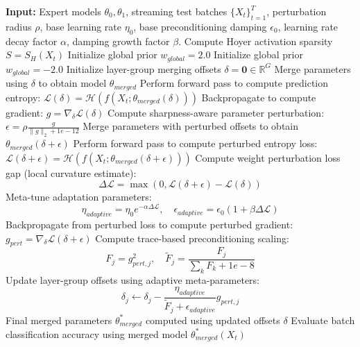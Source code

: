 \documentclass{article}
\theoremstyle{plain}
\theoremstyle{definition}
\theoremstyle{remark}
\begin{document}
\begin{algorithm}[H]
\caption{Curvature-Guided Meta-Learning for Test-Time Model Merging (CG-MTTMM)}
\label{alg:cgmttmm}
\begin{algorithmic}[1]
\STATE \textbf{Input:} Expert models $\theta_0, \theta_1$, streaming test batches $\{X_t\}_{t=1}^T$, perturbation radius $\rho$, base learning rate $\eta_0$, base preconditioning damping $\epsilon_0$, learning rate decay factor $\alpha$, damping growth factor $\beta$.
    \STATE Compute Hoyer activation sparsity $S = S_H(X_t)$
        \STATE Initialize global prior $w_{global} = 2.0$ 
    \ELSE
        \STATE Initialize global prior $w_{global} = -2.0$ 
    \ENDIF
    \STATE Initialize layer-group merging offsets $\delta = \mathbf{0} \in \mathbb{R}^G$
    \STATE Merge parameters using $\delta$ to obtain model $\theta_{merged}$
    \STATE Perform forward pass to compute prediction entropy: $\mathcal{L}(\delta) = \mathcal{H}(f(X_t; \theta_{merged}(\delta)))$
    \STATE Backpropagate to compute gradient: $g = \nabla_{\delta} \mathcal{L}(\delta)$
    \STATE Compute sharpness-aware parameter perturbation: $\epsilon = \rho \frac{g}{\|g\|_2 + 1e-12}$
    \STATE Merge parameters with perturbed offsets to obtain $\theta_{merged}(\delta + \epsilon)$
    \STATE Perform forward pass to compute perturbed entropy loss: $\mathcal{L}(\delta + \epsilon) = \mathcal{H}(f(X_t; \theta_{merged}(\delta + \epsilon)))$
    \STATE Compute weight perturbation loss gap (local curvature estimate):
    $$\Delta \mathcal{L} = \max(0, \mathcal{L}(\delta + \epsilon) - \mathcal{L}(\delta))$$
    \STATE Meta-tune adaptation parameters:
    $$\eta_{adaptive} = \eta_0 e^{-\alpha \Delta \mathcal{L}}, \quad \epsilon_{adaptive} = \epsilon_0 (1 + \beta \Delta \mathcal{L})$$
    \STATE Backpropagate from perturbed loss to compute perturbed gradient: $g_{pert} = \nabla_{\delta} \mathcal{L}(\delta + \epsilon)$
    \STATE Compute trace-based preconditioning scaling:
    $$F_j = g_{pert, j}^2, \quad \tilde{F}_j = \frac{F_j}{\sum_k F_k + 1e-8}$$
    \STATE Update layer-group offsets using adaptive meta-parameters:
    $$\delta_j \leftarrow \delta_j - \frac{\eta_{adaptive}}{\tilde{F}_j + \epsilon_{adaptive}} g_{pert, j}$$
    \STATE Final merged parameters $\theta^*_{merged}$ computed using updated offsets $\delta$
    \STATE Evaluate batch classification accuracy using merged model $\theta^*_{merged}(X_t)$
\ENDFOR
\end{algorithmic}
\end{algorithm}
\end{document}

